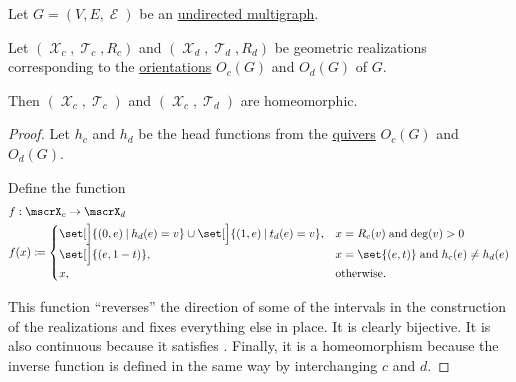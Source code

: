 \begin{proposition}\label{thm:undirected_multigraph_geometric_realizations_homeomorphic}
  Let \( G = (V, E, \mscrE) \) be an \hyperref[def:undirected_multigraph]{undirected multigraph}.

  Let \( (\mscrX_c, \mscrT_c, R_c) \) and \( (\mscrX_d, \mscrT_d, R_d) \) be geometric realizations corresponding to the \hyperref[def:multigraph_orientation]{orientations} \( O_c(G) \) and \( O_d(G) \) of \( G \).

  Then \( (\mscrX_c, \mscrT_c) \) and \( (\mscrX_c, \mscrT_d) \) are homeomorphic.
\end{proposition}
\begin{proof}
  Let \( h_c \) and \( h_d \) be the head functions from the \hyperref[def:quiver]{quivers} \( O_c(G) \) and \( O_d(G) \).

  Define the function
  \begin{equation*}
    \begin{aligned}
      &f: \mscrX_c \to \mscrX_d \\
      &f(x) \coloneqq \begin{cases}
        \set[\Big]{ (0, e) \given h_d(e) = v } \cup \set[\Big]{ (1, e) \given t_d(e) = v }, &x = R_c(v) \T{and} \deg(v) > 0 \\
        \set[\Big]{ (e, 1 - t) },                                                           &x = \set{ (e, t) } \T{and} h_c(e) \neq h_d(e) \\
        x,                                                                                  &\T{otherwise.}
      \end{cases}
    \end{aligned}
  \end{equation*}

  This function \enquote{reverses} the direction of some of the intervals in the construction of the realizations and fixes everything else in place. It is clearly bijective. It is also continuous because it satisfies . Finally, it is a homeomorphism because the inverse function is defined in the same way by interchanging \( c \) and \( d \).
\end{proof}

